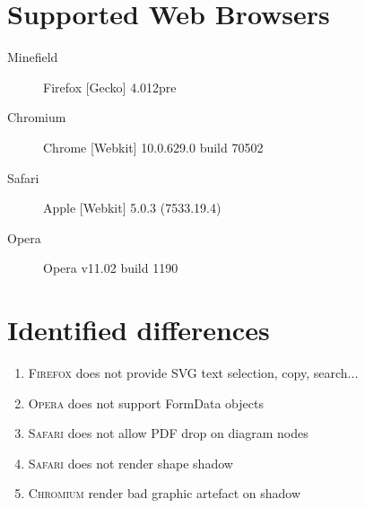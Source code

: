 \documentclass{article}
\newcommand{\ff}{\textsc{Firefox}\xspace}
\newcommand{\ch}{\textsc{Chromium}\xspace}
\newcommand{\sa}{\textsc{Safari}\xspace}
\newcommand{\op}{\textsc{Opera}\xspace}
\begin{document}
\section{Supported Web Browsers}
\date{\today}
\begin{description}
\item[Minefield] Firefox [Gecko] 4.012pre
\item[Chromium] Chrome [Webkit] 10.0.629.0 build 70502
\item[Safari] Apple [Webkit] 5.0.3 (7533.19.4)
\item[Opera] Opera v11.02 build 1190
\end{description}

\section{Identified differences}
\begin{enumerate}
\item \ff does not provide SVG text selection, copy, search...
\item \op does not support FormData objects
\item \sa does not allow PDF drop on diagram nodes
\item \sa does not render shape shadow
\item \ch render bad graphic artefact on shadow 
\end{enumerate}
\end{document}
